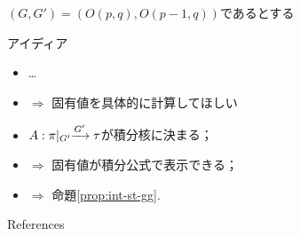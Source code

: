 \documentclass[pdf,notes]{beamer}
\renewcommand{\implies}{\Rightarrow}
\begin{document}
\begin{frame}{$(G,G')=\left( O(p,q),O(p-1,q) \right)$であるとする}
\begin{center}
	\begin{tikzpicture}
	
	\end{tikzpicture}
\end{center}
\end{frame}
\begin{frame}{アイディア}
	\begin{itemize}%
		\item \ldots
		\item $\implies$ 固有値を具体的に計算してほしい
		\item $\mysbo$が積分核に決まる；
		\item $\implies$ 固有値が積分公式で表示できる；
		\item $\implies$ 命題\kern-0.1cm\ref{prop:int-st-gg}.
	\end{itemize}
\end{frame}
\begin{frame}[allowframebreaks]{References}
	
	\nocite{Selberg:411367}
	\nocite{warnaar2010sl3}
	\nocite{dotsenko1985four}
	\nocite{tarasov2003selberg}

\end{frame}
\end{document}
